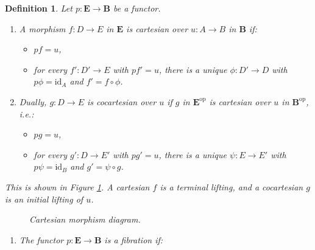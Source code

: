 \documentclass{article}
\theoremstyle{plain}
\newtheorem{definition}[theorem]{Definition}
\theoremstyle{remark}
\begin{document}
\begin{definition}
\label{def:2.1}
Let $p : \mathbf{E} \to \mathbf{B}$ be a functor.
\begin{enumerate}
    \item[(i)] A morphism $f : D \to E$ in $\mathbf{E}$ is \emph{cartesian} over $u : A \to B$ in $\mathbf{B}$ if:
        \begin{itemize}
            \item[(a)] $p f = u$,
            \item[(b)] for every $f' : D' \to E$ with $p f' = u$, there is a unique $\phi : D' \to D$ with $p \phi = \text{id}_A$ and $f' = f \circ \phi$.
        \end{itemize}
    \item[(ii)] Dually, $g : D \to E$ is \emph{cocartesian} over $u$ if $g$ in $\mathbf{E}^{\text{op}}$ is cartesian over $u$ in $\mathbf{B}^{\text{op}}$, i.e.:
        \begin{itemize}
            \item[(a)] $p g = u$,
            \item[(b)] for every $g' : D \to E'$ with $p g' = u$, there is a unique $\psi : E \to E'$ with $p \psi = \text{id}_B$ and $g' = \psi \circ g$.
        \end{itemize}
\end{enumerate}
This is shown in Figure \ref{fig:cartesian-cocartesian}. A cartesian $f$ is a \emph{terminal lifting}, and a cocartesian $g$ is an \emph{initial lifting} of $u$.
\begin{figure}[h]
    \centering
    \caption{Cartesian morphism diagram.}
    \label{fig:cartesian-cocartesian}
\end{figure}
\begin{enumerate}
    \item[(iii)] The functor $p : \mathbf{E} \to \mathbf{B}$ is a \emph{fibration} if:
        \begin{itemize}

\end{itemize}
\end{enumerate}
\end{definition}
\end{document}
